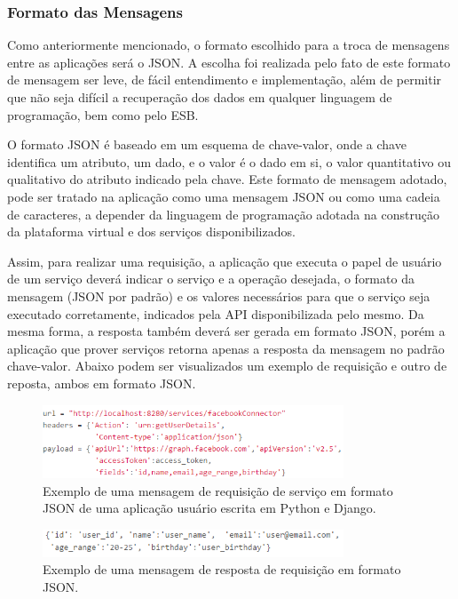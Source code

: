 \subsubsection{Formato das Mensagens}
Como anteriormente mencionado, o formato escolhido para a troca de mensagens entre as aplicações será o JSON. A escolha foi realizada pelo fato de este formato de mensagem ser leve, de fácil entendimento e implementação, além de permitir que não seja difícil a recuperação dos dados em qualquer linguagem de programação, bem como pelo ESB.

O formato JSON é baseado em um esquema de chave-valor, onde a chave identifica um atributo, um dado, e o valor é o dado em si, o valor quantitativo ou qualitativo do atributo indicado pela chave. Este formato de mensagem adotado, pode ser tratado na aplicação como uma mensagem JSON ou como uma cadeia de caracteres, a depender da linguagem de programação adotada na construção da plataforma virtual e dos serviços disponibilizados.

Assim, para realizar uma requisição, a aplicação que executa o papel de usuário de um serviço deverá indicar o serviço e a operação desejada, o formato da mensagem (JSON por padrão) e os valores necessários para que o serviço seja executado corretamente, indicados pela API disponibilizada pelo mesmo. Da mesma forma, a resposta também deverá ser gerada em formato JSON, porém a aplicação que prover serviços retorna apenas a resposta da mensagem no padrão chave-valor. Abaixo podem ser visualizados um exemplo de requisição e outro de reposta, ambos em formato JSON.

\begin{figure}[htb]
\centering
\includegraphics[width=0.8\textwidth]{figuras/mensagem_requisicao.PNG}
\caption{Exemplo de uma mensagem de requisição de serviço em formato JSON de uma aplicação usuário escrita em Python e Django.}
\label{mensagem_requisicao}
\end{figure}

\begin{figure}[htb]
\centering
\includegraphics[width=0.8\textwidth]{figuras/mensagem_resposta.PNG}
\caption{Exemplo de uma mensagem de resposta de requisição em formato JSON.}
\label{mensagem_resposta}
\end{figure}


